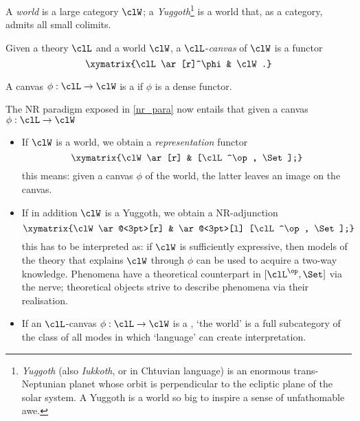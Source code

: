 \begin{definition}\label{mondo_yalda}
	A \emph{world} is a large category $\clW$; a \emph{Yuggoth}\footnote{\emph{Yuggoth} (also \emph{Iukkoth}, or {\yugg} in Chtuvian language) is an enormous trans-Neptunian planet whose orbit is perpendicular to the ecliptic plane of the solar system. A Yuggoth is a world so big to inspire a sense of unfathomable awe.} is a world that, as a category, admits all small colimits.
\end{definition}
\begin{definition}\label{canvas_scienza}
	Given a theory $\clL$ and a world $\clW$, a $\clL$-\emph{canvas} of $\clW$ is a functor
	\[\xymatrix{\clL \ar[r]^\phi & \clW.}\]

	A canvas $\phi : \clL \to \clW$ is a \emph{\science} if $\phi$ is a dense functor.
\end{definition}
\begin{remark}\label{remark_yuggoth_1}
	The NR paradigm exposed in \autoref{nr_para} now entails that given a canvas $\phi : \clL \to \clW$
	\begin{itemize}
		\item If $\clW$ is a world, we obtain a \emph{representation} functor
		      \[ \xymatrix{\clW \ar[r] & [\clL^\op, \Set];} \label{mvndvs}\]
		      this means: given a canvas $\phi$ of the world, the latter leaves an image on the canvas.
		\item If in addition $\clW$ is a Yuggoth, we obtain a NR-adjunction
		      \[\xymatrix{\clW \ar@<3pt>[r] & \ar@<3pt>[l] [\clL^\op, \Set];}\]
		      this has to be interpreted as: if $\clW$ is sufficiently expressive, then models of the theory that explains $\clW$ through $\phi$ can be used to acquire a two-way knowledge. Phenomena have a theoretical counterpart in $[\clL^\op,\Set]$ via the nerve; theoretical objects strive to describe phenomena via their realisation.
		\item If an $\clL$-canvas $\phi : \clL \to \clW$ is a \science, `the world' is a full subcategory of the class of all modes in which `language' can create interpretation.
	\end{itemize}
\end{remark}
